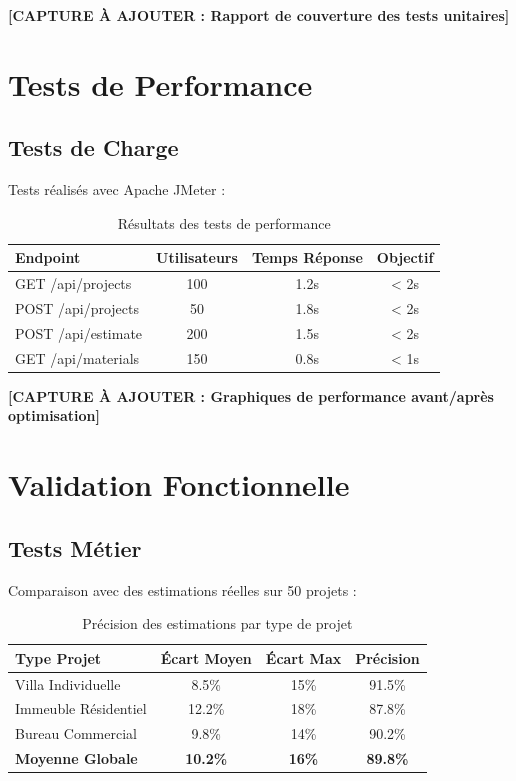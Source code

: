 \textbf{[CAPTURE À AJOUTER : Rapport de couverture des tests unitaires]}

\section{Tests de Performance}

\subsection{Tests de Charge}

Tests réalisés avec Apache JMeter :

\begin{table}[h]
\centering
\begin{tabular}{|l|c|c|c|}
\hline
\textbf{Endpoint} & \textbf{Utilisateurs} & \textbf{Temps Réponse} & \textbf{Objectif} \\
\hline
GET /api/projects & 100 & 1.2s & < 2s \\
\hline
POST /api/projects & 50 & 1.8s & < 2s \\
\hline
POST /api/estimate & 200 & 1.5s & < 2s \\
\hline
GET /api/materials & 150 & 0.8s & < 1s \\
\hline
\end{tabular}
\caption{Résultats des tests de performance}
\end{table}

\textbf{[CAPTURE À AJOUTER : Graphiques de performance avant/après optimisation]}

\section{Validation Fonctionnelle}

\subsection{Tests Métier}

Comparaison avec des estimations réelles sur 50 projets :

\begin{table}[h]
\centering
\begin{tabular}{|l|c|c|c|}
\hline
\textbf{Type Projet} & \textbf{Écart Moyen} & \textbf{Écart Max} & \textbf{Précision} \\
\hline
Villa Individuelle & 8.5\% & 15\% & 91.5\% \\
\hline
Immeuble Résidentiel & 12.2\% & 18\% & 87.8\% \\
\hline
Bureau Commercial & 9.8\% & 14\% & 90.2\% \\
\hline
\textbf{Moyenne Globale} & \textbf{10.2\%} & \textbf{16\%} & \textbf{89.8\%} \\
\hline
\end{tabular}
\caption{Précision des estimations par type de projet}
\end{table}

